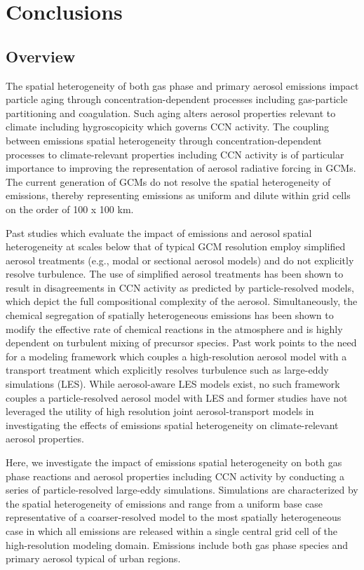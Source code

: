 \chapter{Conclusions}

\section{Overview}
The spatial heterogeneity of both gas phase and primary aerosol emissions impact particle aging through concentration-dependent processes including gas-particle partitioning and coagulation. Such aging alters aerosol properties relevant to climate including hygroscopicity which governs CCN activity. The coupling between emissions spatial heterogeneity through concentration-dependent processes to climate-relevant properties including CCN activity is of particular importance to improving the representation of aerosol radiative forcing in GCMs. The current generation of GCMs do not resolve the spatial heterogeneity of emissions, thereby representing emissions as uniform and dilute within grid cells on the order of 100 x 100 km. 

Past studies which evaluate the impact of emissions and aerosol spatial heterogeneity at scales below that of typical GCM resolution employ simplified aerosol treatments (e.g., modal or sectional aerosol models) and do not explicitly resolve turbulence. The use of simplified aerosol treatments has been shown to result in disagreements in CCN activity as predicted by particle-resolved models, which depict the full compositional complexity of the aerosol. Simultaneously, the chemical segregation of spatially heterogeneous emissions has been shown to modify the effective rate of chemical reactions in the atmosphere and is highly dependent on turbulent mixing of precursor species. Past work points to the need for a modeling framework which couples a high-resolution aerosol model with a transport treatment which explicitly resolves turbulence such as large-eddy simulations (LES). While aerosol-aware LES models exist, no such framework couples a particle-resolved aerosol model with LES and former studies have not leveraged the utility of high resolution joint aerosol-transport models in investigating the effects of emissions spatial heterogeneity on climate-relevant aerosol properties. 

Here, we investigate the impact of emissions spatial heterogeneity on both gas phase reactions and aerosol properties including CCN activity by conducting a series of particle-resolved large-eddy simulations. Simulations are characterized by the spatial heterogeneity of emissions and range from a uniform base case representative of a coarser-resolved model to the most spatially heterogeneous case in which all emissions are released within a single central grid cell of the high-resolution modeling domain. Emissions include both gas phase species and primary aerosol typical of urban regions. 


